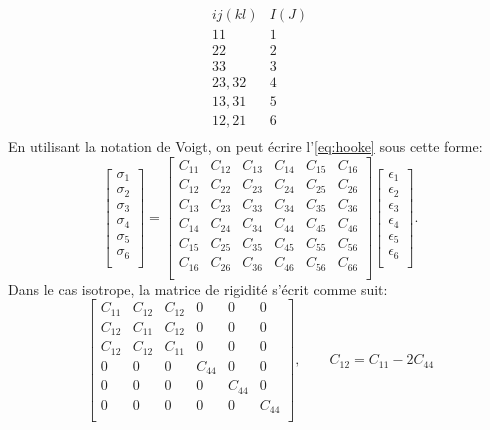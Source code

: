 $$\begin{matrix}
ij(kl) & I(J)\\
 11 & 1 \\
 22 & 2 \\
 33 & 3 \\
 23, 32 & 4 \\
 13, 31 & 5 \\
 12, 21 & 6 \\
\end{matrix}$$
En utilisant la notation de Voigt, on peut écrire l’\cref{eq:hooke} sous cette forme:
\[ 
    \begin{bmatrix}
        \sigma_{1} \\
        \sigma_{2} \\ 
        \sigma_{3} \\
        \sigma_{4} \\
        \sigma_{5} \\
        \sigma_{6} \\
    \end{bmatrix}
    =
    \begin{bmatrix}
        C_{11} & C_{12} & C_{13} & C_{14} & C_{15} & C_{16} \\
        C_{12} & C_{22} & C_{23} & C_{24} & C_{25} & C_{26} \\
        C_{13} & C_{23} & C_{33} & C_{34} & C_{35} & C_{36} \\
        C_{14} & C_{24} & C_{34} & C_{44} & C_{45} & C_{46} \\
        C_{15} & C_{25} & C_{35} & C_{45} & C_{55} & C_{56} \\
        C_{16} & C_{26} & C_{36} & C_{46} & C_{56} & C_{66} \\
    \end{bmatrix}
    \begin{bmatrix}
        \epsilon_{1} \\
        \epsilon_{2} \\ 
        \epsilon_{3} \\
        \epsilon_{4} \\
        \epsilon_{5} \\
        \epsilon_{6} \\
    \end{bmatrix}
.\]
Dans le cas isotrope, la matrice de rigidité s’écrit comme suit:
\[ 
    \begin{bmatrix}
        C_{11} & C_{12} & C_{12} &   0    &   0    &    0   \\
        C_{12} & C_{11} & C_{12} &   0    &   0    &    0   \\
        C_{12} & C_{12} & C_{11} &   0    &   0    &    0   \\
           0   &   0    &   0    & C_{44} &   0    &    0   \\
           0   &   0    &   0    &   0    & C_{44} &    0   \\
           0   &   0    &   0    &   0    &   0    & C_{44} \\
    \end{bmatrix}
, \qquad C_{12} = C_{11} - 2C_{44}
\]
